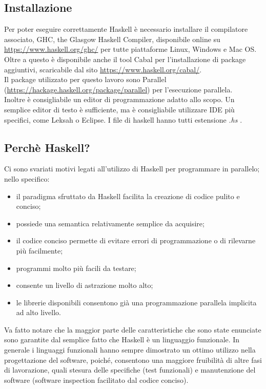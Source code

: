 \subsection{Installazione}
Per poter eseguire correttamente Haskell è necessario installare il compilatore associato, GHC, the Glasgow Haskell Compiler, disponibile online su \url{https://www.haskell.org/ghc/} per tutte piattaforme Linux, Windows e Mac OS.\\
Oltre a questo è disponibile anche il tool Cabal per l'installazione di package aggiuntivi, scaricabile dal sito \url{https://www.haskell.org/cabal/}.\\
Il package utilizzato per questo lavoro sono Parallel (\url{https://hackage.haskell.org/package/parallel}) per l'esecuzione parallela.\\
Inoltre è consigliabile un editor di programmazione adatto allo scopo. Un semplice editor di testo è sufficiente, ma è consigliabile utilizzare IDE più specifici, come Leksah o Eclipse. I file di haskell hanno tutti estensione \textit{.hs} .
\subsection{Perchè Haskell?}
Ci sono svariati motivi legati all'utilizzo di Haskell per programmare in parallelo; nello specifico:
\begin{itemize}
\item{il paradigma sfruttato da Haskell facilita la creazione di codice pulito e conciso;}
\item{possiede una semantica relativamente semplice da acquisire;}
\item{il codice conciso permette di evitare errori di programmazione o di rilevarne più facilmente;}
\item{programmi molto più facili da testare;}
\item{consente un livello di astrazione molto alto;}
\item{le librerie disponibili consentono già una programmazione parallela implicita ad alto livello.}
\end{itemize}
Va fatto notare che la maggior parte delle caratteristiche che sono state enunciate sono garantite dal semplice fatto che Haskell è un linguaggio funzionale. In generale i linguaggi funzionali hanno sempre dimostrato un ottimo utilizzo nella progettazione del software, poiché, consentono una maggiore fruibilità di altre fasi di lavorazione, quali stesura delle specifiche (test funzionali) e manutenzione del software (software inspection facilitato dal codice conciso).\\
